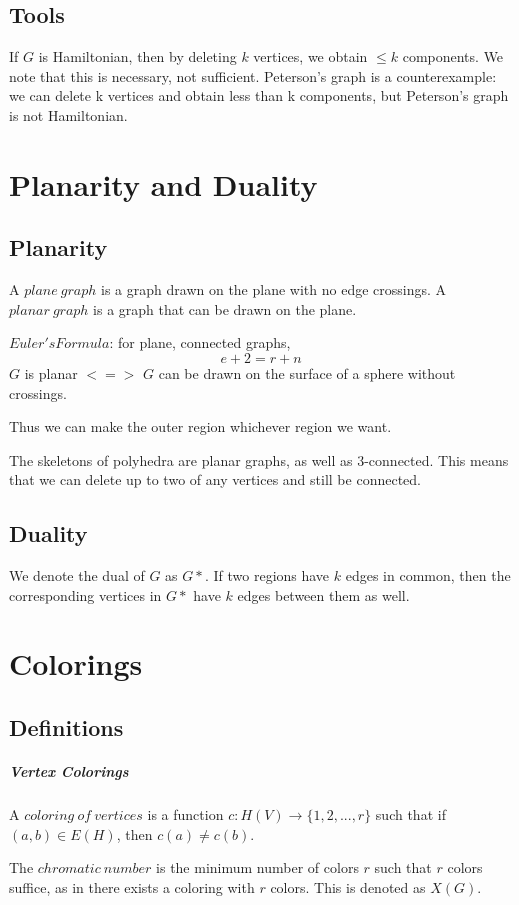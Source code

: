 \documentclass{article}
\begin{document}
\subsection{Tools}
If $G$ is Hamiltonian, then by deleting $k$ vertices, we obtain $\leq k$ components.
We note that this is necessary, not sufficient. Peterson's graph is a counterexample:
we can delete k vertices and obtain less than k components, but Peterson's graph
is not Hamiltonian.

\section{Planarity and Duality}
\subsection{Planarity}
A $plane \ graph$ is a graph drawn on the plane with no edge crossings.
A $planar \ graph$ is a graph that can be drawn on the plane.

$Euler's Formula$: for plane, connected graphs, \[e + 2 = r + n\]
$G$ is planar $<=>$ $G$ can be drawn on the surface of a sphere without crossings.

Thus we can make the outer region whichever region we want.

The skeletons of polyhedra are planar graphs, as well as 3-connected. 
This means that we can delete up to two of any vertices and still be connected.

\subsection{Duality}
We denote the dual of $G$ as $G*$.
If two regions have $k$ edges in common, then the corresponding vertices in $G*$ have $k$ edges between them as well.

\section{Colorings}
\subsection{Definitions}
\subparagraph{Vertex Colorings}
A $coloring \ of \ vertices$ is a function $c:H(V)\rightarrow\lbrace1,2,...,r\rbrace$ such that
if $(a,b) \in E(H)$, then $c(a) \neq c(b)$. 

The $chromatic \ number$ is the minimum number of colors $r$ such that
$r$ colors suffice, as in there exists a coloring with $r$ colors.
This is denoted as $X\left(G\right)$.
\end{document}
